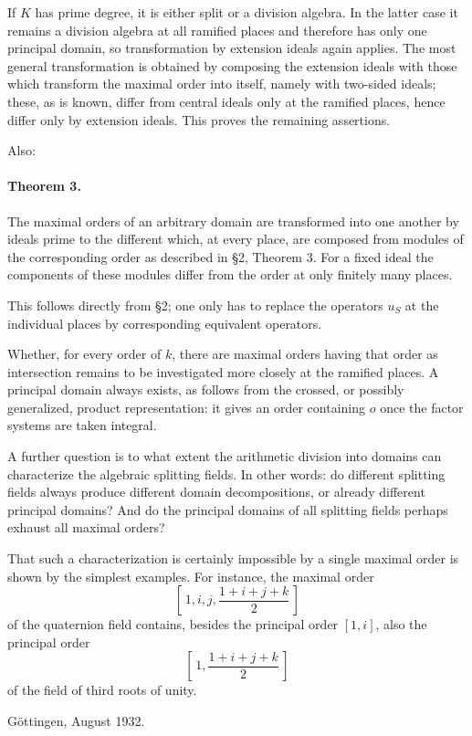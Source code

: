 \documentclass[11pt]{article}
\begin{document}
If \(K\) has prime degree, it is either split or a division algebra. In the latter case it remains a division algebra at all ramified places and therefore has only one principal domain, so transformation by extension ideals again applies. The most general transformation is obtained by composing the extension ideals with those which transform the maximal order into itself, namely with two-sided ideals; these, as is known, differ from central ideals only at the ramified places, hence differ only by extension ideals. This proves the remaining assertions.

Also:

\paragraph{Theorem 3.}
The maximal orders of an arbitrary domain are transformed into one another by ideals prime to the different which, at every place, are composed from modules of the corresponding order as described in §2, Theorem 3. For a fixed ideal the components of these modules differ from the order at only finitely many places.

This follows directly from §2; one only has to replace the operators \(u_S\) at the individual places by corresponding equivalent operators.

Whether, for every order of \(k\), there are maximal orders having that order as intersection remains to be investigated more closely at the ramified places. A principal domain always exists, as follows from the crossed, or possibly generalized, product representation: it gives an order containing \(o\) once the factor systems are taken integral.

A further question is to what extent the arithmetic division into domains can characterize the algebraic splitting fields. In other words: do different splitting fields always produce different domain decompositions, or already different principal domains? And do the principal domains of all splitting fields perhaps exhaust all maximal orders?

That such a characterization is certainly impossible by a single maximal order is shown by the simplest examples. For instance, the maximal order
\[
        \left[\,1,i,j,\frac{1+i+j+k}{2}\,\right]
\]
of the quaternion field contains, besides the principal order \([1,i]\), also the principal order
\[
        \left[\,1,\frac{1+i+j+k}{2}\,\right]
\]
of the field of third roots of unity.

\begin{center}
Göttingen, August 1932.
\end{center}
\end{document}
